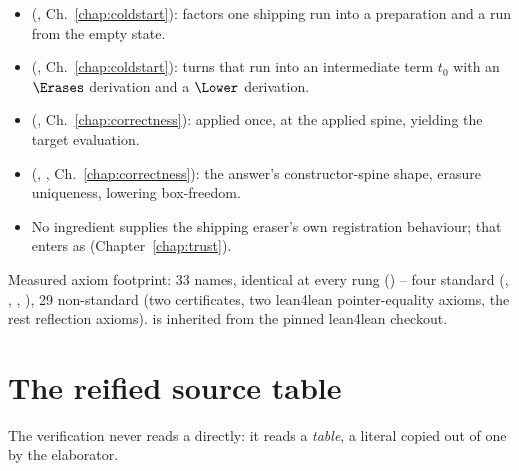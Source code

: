 \begin{itemize}
\item {} (, Ch.~\ref{chap:coldstart}): factors one shipping run
into a preparation and a  run from the empty state.
\item {} (, Ch.~\ref{chap:coldstart}): turns that run
into an intermediate \lbox{} term $t_0$ with an $\Erases$ derivation and a $\Lower$ derivation.
\item {} (, Ch.~\ref{chap:correctness}): applied once, at
the applied spine, yielding the target evaluation.
\item {} (, ,
Ch.~\ref{chap:correctness}): the answer's constructor-spine shape, erasure uniqueness, lowering
box-freedom.
\item {} No ingredient supplies the shipping eraser's own registration behaviour; that
enters as \hl{} (Chapter~\ref{chap:trust}).
\end{itemize}

 Measured axiom footprint: 33 names, identical at every rung ()
-- four standard (, , , ), 29
non-standard (two  certificates, two lean4lean pointer-equality axioms, the rest
reflection axioms).  is inherited from the pinned lean4lean checkout.

\section{The reified source table}
\label{sec:capstone:table}

The verification never reads a  directly: it reads a \emph{table}, a literal
copied out of one by the  elaborator.

